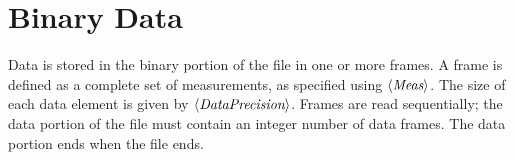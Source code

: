 \documentclass[12pt]{article}
\newcommand{\keyword}[1]{\mbox{$\left<\mbox{\it #1}\right>$}\/}
\begin{document}

\section{Binary Data}

Data is stored in the binary portion of the file in one or more
frames.  A frame is defined as a complete set of measurements, as
specified using \keyword{Meas}.  The size of each data element is
given by \keyword{DataPrecision}.  Frames are read sequentially; the
data portion of the file must contain an integer number of data
frames.  The data portion ends when the file ends.
\end{document}
